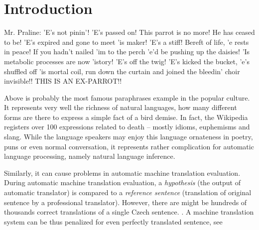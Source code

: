 \chapter*{Introduction}


Mr. Praline: 'E's not pinin'! 'E's passed on! This parrot is no more! He has ceased to be! 'E's expired and gone to meet 'is maker! 'E's a stiff! Bereft of life, 'e rests in peace! If you hadn't nailed 'im to the perch 'e'd be pushing up the daisies! 'Is metabolic processes are now 'istory! 'E's off the twig! 'E's kicked the bucket, 'e's shuffled off 'is mortal coil, run down the curtain and joined the bleedin' choir invisible!! THIS IS AN EX-PARROT!! \cite{parrot}

Above is probably the most famous paraphrases example in the popular culture. 
It represents very well the richness of natural languages, how many different forms are there to express a simple fact of a bird demise. 
In fact, the Wikipedia registers over 100 expressions related to death -- mostly idioms, euphemisms and slang.  \citep{wiki:death} 
While the language speakers may enjoy this language ornateness in poetry, puns or even normal conversation, it represents rather complication for automatic language processing, namely natural language inference.




Similarly, it can cause problems in automatic machine translation evaluation. 
During automatic machine translation evaluation, a \emph{hypothesis} (the output of automatic translator) is compared to a \emph{reference sentence} (translation of original sentence by a professional translator). 
However, there are might be hundreds of thousands correct translations of a single Czech sentence. \citep{bojar-scratching}. 
A machine translation system can be thus penalized for even perfectly translated sentence, see 

